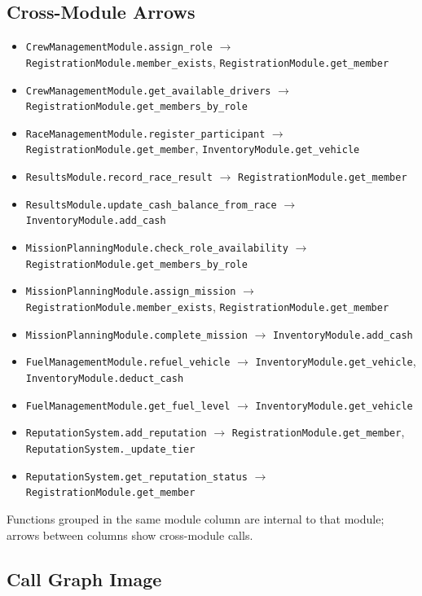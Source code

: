 \documentclass[12pt]{article}
\begin{document}
\subsection{Cross-Module Arrows}
\begin{itemize}
\item \texttt{CrewManagementModule.assign\_role} $\rightarrow$ \texttt{RegistrationModule.member\_exists}, \texttt{RegistrationModule.get\_member}
\item \texttt{CrewManagementModule.get\_available\_drivers} $\rightarrow$ \texttt{RegistrationModule.get\_members\_by\_role}
\item \texttt{RaceManagementModule.register\_participant} $\rightarrow$ \texttt{RegistrationModule.get\_member}, \texttt{InventoryModule.get\_vehicle}
\item \texttt{ResultsModule.record\_race\_result} $\rightarrow$ \texttt{RegistrationModule.get\_member}
\item \texttt{ResultsModule.update\_cash\_balance\_from\_race} $\rightarrow$ \texttt{InventoryModule.add\_cash}
\item \texttt{MissionPlanningModule.check\_role\_availability} $\rightarrow$ \texttt{RegistrationModule.get\_members\_by\_role}
\item \texttt{MissionPlanningModule.assign\_mission} $\rightarrow$ \texttt{RegistrationModule.member\_exists}, \texttt{RegistrationModule.get\_member}
\item \texttt{MissionPlanningModule.complete\_mission} $\rightarrow$ \texttt{InventoryModule.add\_cash}
\item \texttt{FuelManagementModule.refuel\_vehicle} $\rightarrow$ \texttt{InventoryModule.get\_vehicle}, \texttt{InventoryModule.deduct\_cash}
\item \texttt{FuelManagementModule.get\_fuel\_level} $\rightarrow$ \texttt{InventoryModule.get\_vehicle}
\item \texttt{ReputationSystem.add\_reputation} $\rightarrow$ \texttt{RegistrationModule.get\_member}, \texttt{ReputationSystem.\_update\_tier}
\item \texttt{ReputationSystem.get\_reputation\_status} $\rightarrow$ \texttt{RegistrationModule.get\_member}
\end{itemize}
Functions grouped in the same module column are internal to that module; arrows between columns show cross-module calls.
\subsection{Call Graph Image}
\begin{center}
\fbox{\rule{0pt}{3in}\rule{0.9\linewidth}{0pt}}

\end{center}
\end{document}
